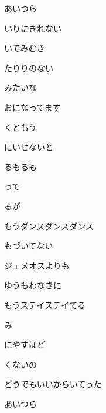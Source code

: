 \documentclass[a4paper,tate,twocolumn,12pt]{ltjtarticle}
\begin{document}
\thispagestyle{empty}

\begin{center}
{\LARGE あいつら}
\end{center}

\vspace{1em}

\begin{flushleft}

\noindent\begin{minipage}{\linewidth}
いりにきれない

いでみむき

たりりのない

みたいな

おになってます

くともう

にいせないと

るもるも

って

るが
\end{minipage}

\vspace{2em}

\noindent\begin{minipage}{\linewidth}
もうダンスダンスダンス

もづいてない

ジェメオスよりも

ゆうもわなきに

もうステイステイてる

み

にやすほど

くないの
\end{minipage}

\vspace{2em}

\noindent\begin{minipage}{\linewidth}
どうでもいいからいてった

あいつら


\end{minipage}
\end{flushleft}
\end{document}
